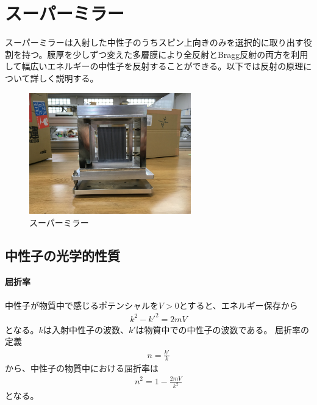 \section{スーパーミラー}
\nocite{neutron_spin_optics}
スーパーミラーは入射した中性子のうちスピン上向きのみを選択的に取り出す役割を持つ。膜厚を少しずつ変えた多層膜により全反射とBragg反射の両方を利用して幅広いエネルギーの中性子を反射することができる。以下では反射の原理について詳しく説明する。
\begin{figure}[H]
\centering
\includegraphics[width=7cm]{device/mirrorphoto.jpg}\caption{スーパーミラー}
\end{figure}

\subsection{中性子の光学的性質}
\paragraph{屈折率}
中性子が物質中で感じるポテンシャルを$V>0$とすると、エネルギー保存から
\begin{align}
k^2-k'^2=2mV
\end{align}
となる。$k$は入射中性子の波数、$k'$は物質中での中性子の波数である。
屈折率の定義
\begin{align}
n=\frac{k'}{k}
\end{align}
から、中性子の物質中における屈折率は
\begin{align}
n^2=1-\frac{2mV}{k^2}\label{mirror_neutron_refindex}
\end{align}
となる。

